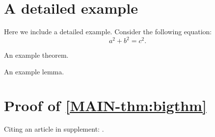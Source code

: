 \documentclass[review]{siamart}
\begin{document}
\TitleAndAuthorCommands
\maketitle

\PageHeaderCommands

\section{A detailed example}

Here we include a detailed example.
Consider the following equation:
\begin{equation}
  \label{eq:suppa}
  a^2 + b^2 = c^2.
\end{equation}

\lipsum[100-101]

\begin{theorem}
  An example theorem.
\end{theorem}

\lipsum[102]
 
\begin{lemma}
  An example lemma.
\end{lemma}

\lipsum[103-105]

\section{Proof of \cref{MAIN-thm:bigthm}}
\label{sec:proof}

\lipsum[106-115]

Citing an article in supplement: \cite{KoMa14}.



\end{document}
